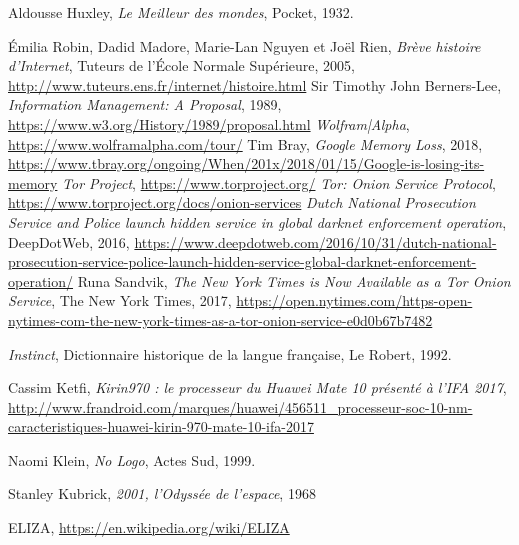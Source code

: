 \begin{thebibliography}{99}
     Aldousse Huxley, \emph{Le Meilleur des mondes}, Pocket, 1932.

     Émilia Robin, Dadid Madore, Marie-Lan Nguyen et Joël Rien, \emph{Brève histoire d'Internet}, Tuteurs de l'École Normale Supérieure, 2005, \url{http://www.tuteurs.ens.fr/internet/histoire.html}
     Sir Timothy John Berners-Lee, \emph{Information Management: A Proposal}, 1989, \url{https://www.w3.org/History/1989/proposal.html}
     \emph{Wolfram|Alpha}, \url{https://www.wolframalpha.com/tour/}
     Tim Bray, \emph{Google Memory Loss}, 2018, \url{https://www.tbray.org/ongoing/When/201x/2018/01/15/Google-is-losing-its-memory}
     \emph{Tor Project}, \url{https://www.torproject.org/}
     \emph{Tor: Onion Service Protocol}, \url{https://www.torproject.org/docs/onion-services}
     \emph{Dutch National Prosecution Service and Police launch hidden service in global darknet enforcement operation}, DeepDotWeb, 2016, \url{https://www.deepdotweb.com/2016/10/31/dutch-national-prosecution-service-police-launch-hidden-service-global-darknet-enforcement-operation/}
     Runa Sandvik, \emph{The New York Times is Now Available as a Tor Onion Service}, The New York Times, 2017, \url{https://open.nytimes.com/https-open-nytimes-com-the-new-york-times-as-a-tor-onion-service-e0d0b67b7482}
    
     \emph{Instinct}, Dictionnaire historique de la langue française, Le Robert, 1992. 

     Cassim Ketfi, \emph{Kirin970 : le processeur du Huawei Mate 10 présenté à l'IFA 2017}, \url{http://www.frandroid.com/marques/huawei/456511_processeur-soc-10-nm-caracteristiques-huawei-kirin-970-mate-10-ifa-2017}

     Naomi Klein, \emph{No Logo}, Actes Sud, 1999.

     Stanley Kubrick, \emph{2001, l'Odyssée de l'espace}, 1968

     ELIZA, \url{https://en.wikipedia.org/wiki/ELIZA}


\end{thebibliography}
